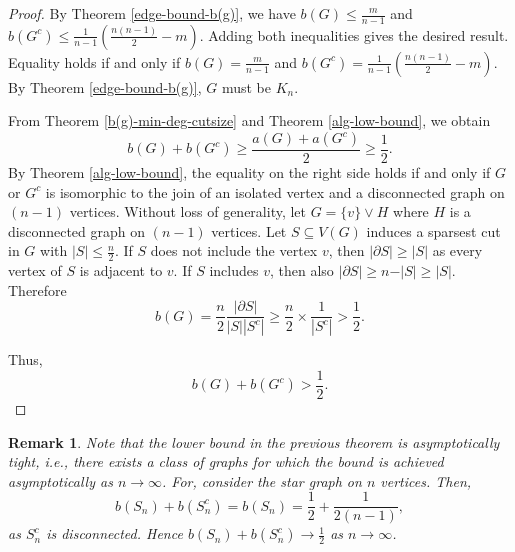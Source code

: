 \documentclass[12pt]{article}
\newtheorem{remark}{Remark}[section]
\DeclareMathOperator{\iso}{iso}
\begin{document}
\begin{proof}
By Theorem \ref{edge-bound-b(g)}, we have $b(G)\leq \frac{m}{n-1}$ and $b(G^c)\leq \frac{1}{n-1}(\frac{n(n-1)}{2}-m)$. Adding both inequalities gives the desired result. Equality holds if and only if $b(G)= \frac{m}{n-1}$ and $b(G^c)= \frac{1}{n-1}(\frac{n(n-1)}{2}-m)$. By Theorem \ref{edge-bound-b(g)}, $G$ must be $K_n$.

From Theorem \ref{b(g)-min-deg-cutsize} and Theorem \ref{alg-low-bound},  we obtain
$$
b(G)+ b(G^c) \geq \frac{a(G)+ a(G^c)}{2} \geq \frac{1}{2}.
$$
 By Theorem \ref{alg-low-bound}, the equality on the right side holds if and only if $G$ or $G^c$ is isomorphic to the join of an isolated vertex and a disconnected graph on $(n-1)$ vertices. 
Without loss of generality, let $G=\{v\} \vee H$ where $H$ is a disconnected graph on $(n-1)$ vertices. Let $S \subseteq V(G)$ induces a sparsest cut in $G$ with $\vert S \vert \leq \frac{n}{2}$. 
If $S$ does not include the vertex $v$, then  $|\partial S| \geq |S| $ as every vertex of $S$ is adjacent to $v$. If $S$ includes $v$, then also $\vert \partial S\vert \geq n-\vert S \vert\geq\vert S \vert$. Therefore
$$
b(G)=\frac{n}{2} \frac{|\partial S|}{|S||S^c|} \geq \frac{n}{2} \times \frac{1}{|S^c|} >\frac{1}{2}.$$

Thus, $$ b(G)+ b(G^c) > \frac{1}{2}.$$
\end{proof}

\begin{remark}
    Note that the lower bound in the previous theorem is asymptotically tight, i.e., there exists a class of graphs for which the bound is achieved asymptotically as $n \rightarrow \infty$. For, consider the star graph on $n$ vertices. Then,
    $$
b(S_n)+b(S_n ^c)= b(S_n) = \frac{1}{2}+\frac{1}{2(n-1)},
    $$
    as $S_n^c$ is disconnected. Hence $b(S_n)+b(S_n ^c) \rightarrow \frac{1}{2}$ as $n \rightarrow \infty$.
    \end{remark}


\end{document}
